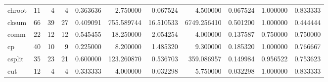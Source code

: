 \begin{tabular}{lrrrrrrrrrr}
chroot    &                                      11 &                  4 &                                 4 &                                   0.363636 &                               2.750000 &                                     0.067524 &                          4.500000 &                                0.067524 &                           1.000000 &                                           0.833333 \\
cksum     &                                      66 &                 39 &                                27 &                                   0.409091 &                             755.589744 &                                    16.510533 &                       6749.256410 &                                0.501200 &                           1.000000 &                                           0.444444 \\
comm      &                                      22 &                 12 &                                12 &                                   0.545455 &                              18.250000 &                                     2.054254 &                          4.000000 &                                0.137587 &                           0.750000 &                                           0.750000 \\
cp        &                                      40 &                 10 &                                 9 &                                   0.225000 &                               8.200000 &                                     1.485320 &                          9.300000 &                                0.185320 &                           1.000000 &                                           0.766667 \\
csplit    &                                      35 &                 23 &                                21 &                                   0.600000 &                             123.260870 &                                     0.536703 &                        359.086957 &                                0.149984 &                           0.956522 &                                           0.753623 \\
cut       &                                      12 &                  4 &                                 4 &                                   0.333333 &                               4.000000 &                                     0.032298 &                          5.750000 &                                0.032298 &                           1.000000 &                                           0.833333 \\

\end{tabular}
